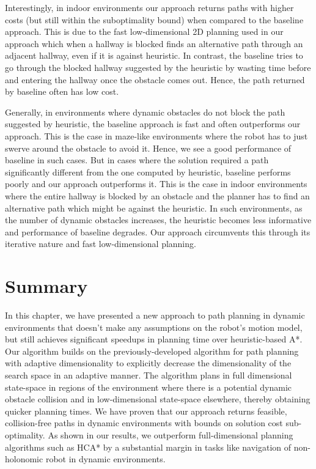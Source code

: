 Interestingly, in indoor environments our approach returns paths with higher costs (but still within the suboptimality bound) when compared to the baseline approach. This is due to the fast low-dimensional 2D planning used in our approach which when a hallway is blocked finds an alternative path through an adjacent hallway, even if it is against heuristic. In contrast, the baseline tries to go through the blocked hallway suggested by the heuristic by wasting time before and entering the hallway once the obstacle comes out. Hence, the path returned by baseline often has low cost.

Generally, in environments where dynamic obstacles do not block the path suggested by heuristic, the baseline approach is fast and often outperforms our approach. This is the case in maze-like environments where the robot has to just swerve around the obstacle to avoid it. Hence, we see a good performance of baseline in such cases. But in cases where the solution required a path significantly different from the one computed by heuristic, baseline performs poorly and our approach outperforms it. This is the case in indoor environments where the entire hallway is blocked by an obstacle and the planner has to find an alternative path which might be against the heuristic. In such environments, as the number of dynamic obstacles increases, the heuristic becomes less informative and performance of baseline degrades. Our approach circumvents this through its iterative nature and fast low-dimensional planning.

\section{Summary}\label{sec:ppad-conclusion}

In this chapter, we have presented a new approach to path planning in dynamic environments that doesn't make any assumptions on the robot's motion model, but still achieves significant speedups in planning time over heuristic-based A*.
Our algorithm builds on the previously-developed algorithm for path planning with adaptive dimensionality to explicitly decrease the dimensionality of the search space in an adaptive manner.
The algorithm plans in full dimensional state-space in regions of the environment where there is a potential dynamic obstacle collision and in low-dimensional state-space elsewhere, thereby obtaining quicker planning times.
We have proven that our approach returns feasible, collision-free paths in dynamic environments with bounds on solution cost sub-optimality. As shown in our results, we outperform full-dimensional planning algorithms such as HCA* by a substantial margin in tasks like navigation of non-holonomic robot in dynamic environments.

